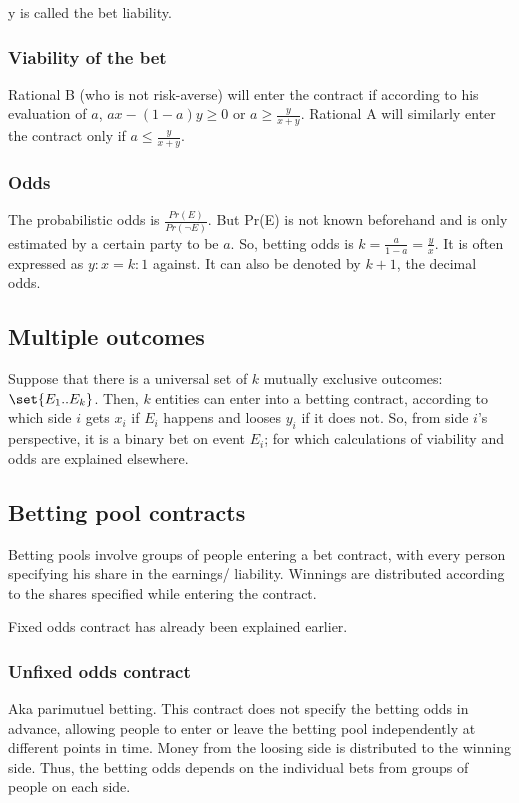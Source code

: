 \documentclass[oneside, article]{memoir}
\begin{document}
y is called the bet liability.

\subsubsection{Viability of the bet}
Rational B (who is not risk-averse) will enter the contract if according to his evaluation of $a$, $ax - (1-a)y \geq 0$ or $a \geq \frac{y}{x+y}$. Rational A will similarly enter the contract only if $a \leq \frac{y}{x+y}$.

\subsubsection{Odds}
The probabilistic odds is $\frac{Pr(E)}{Pr(\lnot E)}$. But Pr(E) is not known beforehand and is only estimated by a certain party to be $a$. So, betting odds is $k = \frac{a}{1-a} = \frac{y}{x}$. It is often expressed as $y:x = k:1$ against. It can also be denoted by $k+1$, the decimal odds.

\subsection{Multiple outcomes}
Suppose that there is a universal set of $k$ mutually exclusive outcomes: \\$\set{E_1 .. E_k}$. Then, $k$ entities can enter into a betting contract, according to which side $i$ gets $x_i$ if $E_i$ happens and looses $y_i$ if it does not. So, from side $i$'s perspective, it is a binary bet on event $E_i$; for which calculations of viability and odds are explained elsewhere.

\subsection{Betting pool contracts}
Betting pools involve groups of people entering a bet contract, with every person specifying his share in the earnings/ liability. Winnings are distributed according to the shares specified while entering the contract.

Fixed odds contract has already been explained earlier.

\subsubsection{Unfixed odds contract}
Aka parimutuel betting. This contract does not specify the betting odds in advance, allowing people to enter or leave the betting pool independently at different points in time. Money from the loosing side is distributed to the winning side. Thus, the betting odds depends on the individual bets from groups of people on each side.
\end{document}

